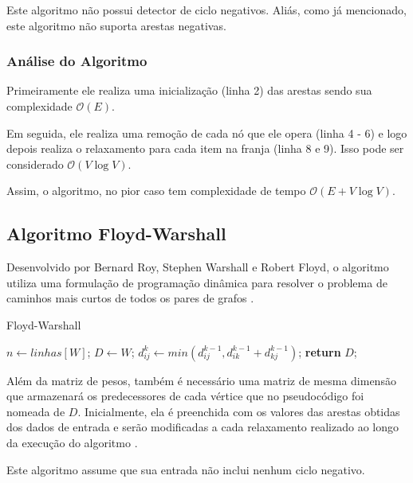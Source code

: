 \documentclass[12pt]{article}
\begin{document}
Este algoritmo não possui detector de ciclo negativos. Aliás, como já mencionado, este algoritmo não suporta arestas negativas.


\subsubsection{Análise do Algoritmo}

Primeiramente ele realiza uma inicialização (linha 2) das arestas sendo sua complexidade  $\mathcal{O}(E)$.

Em seguida, ele realiza uma remoção de cada nó que ele opera (linha 4 - 6) e logo depois realiza o relaxamento para cada item na franja (linha 8 e 9). Isso pode ser considerado $\mathcal{O}(V\log V)$.

Assim, o algoritmo, no pior caso tem complexidade de tempo $\mathcal{O}(E + V\log V)$.

\subsection{Algoritmo Floyd-Warshall}

Desenvolvido por Bernard Roy, Stephen Warshall e Robert Floyd, o algoritmo utiliza uma formulação de programação dinâmica para resolver o problema de caminhos mais curtos de todos os pares de grafos \cite{cormen2002algoritmos}.


\begin{algorithm}[H]
\caption{Floyd-Warshall}\label{alg:fw}
\begin{algorithmic}[1]
	\State $n \gets linhas[W]$;
   \State $D\gets W$;
           \State $d^k_{ij} \gets min(d^{k-1}_{ij}, d^{k-1}_{ik} + d^{k-1}_{kj})$;
       \EndFor
     \EndFor
   \EndFor
   \State \textbf{return} $D$;
\EndProcedure
\end{algorithmic}
\end{algorithm}



Além da matriz de pesos, também é necessário uma matriz de mesma dimensão que armazenará os predecessores de cada vértice que no pseudocódigo foi nomeada de $D$. Inicialmente, ela é preenchida com os valores das arestas obtidas dos dados de entrada e serão modificadas a cada relaxamento realizado ao longo da execução do algoritmo \cite{cormen2002algoritmos}.

Este algoritmo assume que sua entrada não inclui nenhum ciclo negativo.
\end{document}
